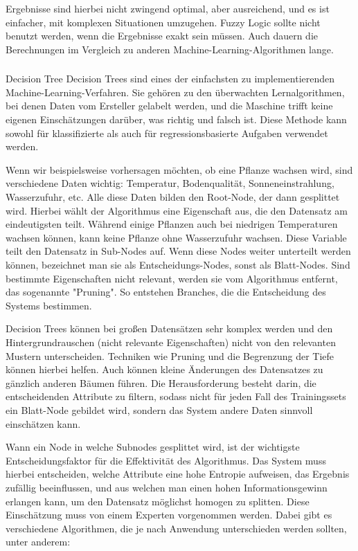 Ergebnisse sind hierbei nicht zwingend optimal, aber ausreichend, und es ist einfacher, mit komplexen Situationen umzugehen. Fuzzy Logic sollte nicht benutzt werden, wenn die Ergebnisse exakt sein müssen. Auch dauern die Berechnungen im Vergleich zu anderen Machine-Learning-Algorithmen lange.

\subsubsection{}{Decision Tree}
Decision Trees sind eines der einfachsten zu implementierenden Machine-Learning-Verfahren. Sie gehören zu den überwachten Lernalgorithmen, bei denen Daten vom Ersteller gelabelt werden, und die Maschine trifft keine eigenen Einschätzungen darüber, was richtig und falsch ist. Diese Methode kann sowohl für klassifizierte als auch für regressionsbasierte Aufgaben verwendet werden.

Wenn wir beispielsweise vorhersagen möchten, ob eine Pflanze wachsen wird, sind verschiedene Daten wichtig: Temperatur, Bodenqualität, Sonneneinstrahlung, Wasserzufuhr, etc. Alle diese Daten bilden den Root-Node, der dann gesplittet wird. Hierbei wählt der Algorithmus eine Eigenschaft aus, die den Datensatz am eindeutigsten teilt. Während einige Pflanzen auch bei niedrigen Temperaturen wachsen können, kann keine Pflanze ohne Wasserzufuhr wachsen. Diese Variable teilt den Datensatz in Sub-Nodes auf. Wenn diese Nodes weiter unterteilt werden können, bezeichnet man sie als Entscheidungs-Nodes, sonst als Blatt-Nodes. Sind bestimmte Eigenschaften nicht relevant, werden sie vom Algorithmus entfernt, das sogenannte "Pruning". So entstehen Branches, die die Entscheidung des Systems bestimmen.

Decision Trees können bei großen Datensätzen sehr komplex werden und den Hintergrundrauschen (nicht relevante Eigenschaften) nicht von den relevanten Mustern unterscheiden. Techniken wie Pruning und die Begrenzung der Tiefe können hierbei helfen. Auch können kleine Änderungen des Datensatzes zu gänzlich anderen Bäumen führen. Die Herausforderung besteht darin, die entscheidenden Attribute zu filtern, sodass nicht für jeden Fall des Trainingssets ein Blatt-Node gebildet wird, sondern das System andere Daten sinnvoll einschätzen kann.

Wann ein Node in welche Subnodes gesplittet wird, ist der wichtigste Entscheidungsfaktor für die Effektivität des Algorithmus. Das System muss hierbei entscheiden, welche Attribute eine hohe Entropie aufweisen, das Ergebnis zufällig beeinflussen, und aus welchen man einen hohen Informationsgewinn erlangen kann, um den Datensatz möglichst homogen zu splitten.\cite{decision-tree-explained} Diese Einschätzung muss von einem Experten vorgenommen werden. Dabei gibt es verschiedene Algorithmen, die je nach Anwendung unterschieden werden sollten, unter anderem:

